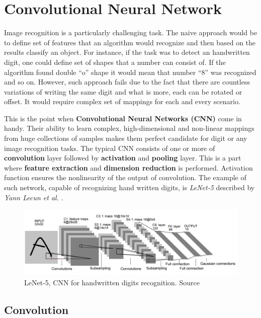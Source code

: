 \chapter{Convolutional Neural Network}
\label{cha:conv}

Image recognition is a particularly challenging task. The naive approach would be to define set of features that an algorithm would recognize and then based on the results classify an object. For instance, if the task was to detect an handwritten digit, one could define set of shapes that a number can consist of. If the algorithm found double ``o'' shape it would mean that number ``8'' was recognized and so on. However, such approach fails due to the fact that there are countless variations of writing the same digit and what is more, each can be rotated or offset. It would require complex set of mappings for each and every scenario.

This is the point when \textbf{Convolutional Neural Networks (CNN)} come in handy. Their ability to learn complex, high-dimensional and non-linear mappings from huge collections of samples makes them perfect candidate for digit or any image recognition tasks. The typical CNN consists of one or more of \textbf{convolution} layer followed by \textbf{activation} and \textbf{pooling} layer. This is a part where \textbf{feature extraction} and \textbf{dimension reduction} is performed. Activation function ensures the nonlinearity of the output of convolution. The example of such network, capable of recognizing hand written digits, is \emph{LeNet-5} described by \emph{Yann Lecun et al.} \cite{GradientBasedLearningDigitRec}.

\begin{figure}
    \centering
    \includegraphics[width=14cm]{img/LeNet-5.png}
    \caption{LeNet-5, CNN for handwritten digits recognition. Source \cite{GradientBasedLearningDigitRec}}
    \label{fig:le-net-5}
\end{figure}

\section{Convolution}
\label{sec:convolution}

